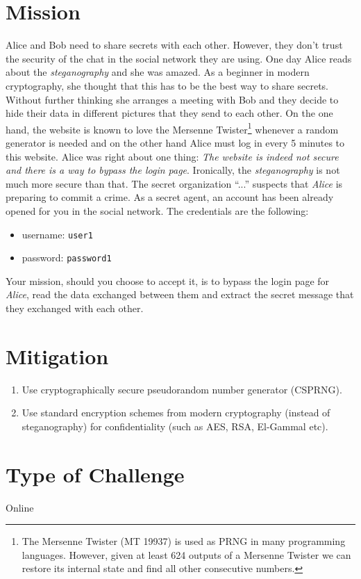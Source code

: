 \documentclass[11pt]{article}
\begin{document}
\section{Mission}
Alice and Bob need to share secrets with each other. However, they don't trust the security of the chat in the social network they are using. One day Alice reads about the \textit{steganography} and she was amazed. As a beginner in modern cryptography, she thought that this has to be the best way to share secrets. Without further thinking she arranges a meeting with Bob and they decide to hide their data in different pictures that they send to each other. On the one hand, the website is known to love the Mersenne Twister\footnote{The Mersenne Twister (MT 19937) is used as PRNG in many programming languages. However, given at least 624 outputs of a Mersenne Twister we can restore its internal state and find all other consecutive numbers.} whenever a random generator is needed and on the other hand Alice must log in every 5 minutes to this website. Alice was right about one thing: \textit{The website is indeed not secure and there is a way to bypass the login page}. Ironically, the \textit{steganography} is not much more secure than that. The secret organization ``...'' suspects that \textit{Alice} is preparing to commit a crime. As a secret agent, an account has been already opened for you in the social network. The credentials are the following:
\begin{itemize}
	\item username: \texttt{user1}
	\item password: \texttt{password1}
\end{itemize}
Your mission, should you choose to accept it, is to bypass the login page for \textit{Alice}, read the data exchanged between them and extract the secret message that they exchanged with each other.

\section{Mitigation}
\begin{enumerate}
\item Use cryptographically secure pseudorandom number generator (CSPRNG).
\item Use standard encryption schemes from modern cryptography (instead of steganography) for confidentiality (such as AES, RSA, El-Gammal etc).
\end{enumerate}


\section{Type of Challenge}
Online
\end{document}
